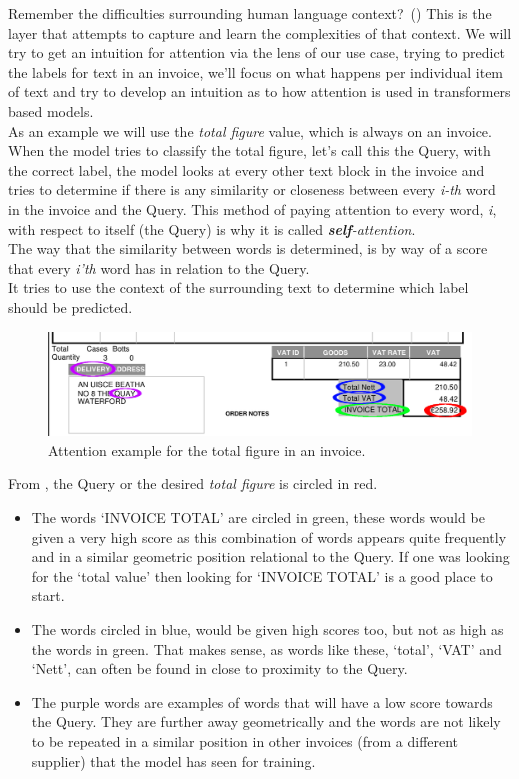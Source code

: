 Remember the difficulties surrounding human language context?~() This is the layer that attempts to capture and learn
the complexities of that context.
\bigbreak
We will try to get an intuition for attention via the lens of our use case, trying to predict the labels for text in an invoice,
we'll focus on what happens per individual item of text and try to develop an intuition as to how attention is used in
transformers based models.\\
As an example we will use the \emph{total figure} value, which is always on an invoice. When the model tries to classify the total figure,
let's call this the Query, with the correct label, the model looks at every other text
block in the invoice and tries to determine if there is any similarity or closeness between every \emph{i-th} word in the invoice and the Query. This
method of paying attention to every word, \emph{i}, with respect to itself (the Query) is why it is called \emph{\textbf{self}-attention}.\\
The way that the similarity between words is determined, is by way of a score that every \emph{i'th} word has in relation to the Query.\\
It tries to use the context of the surrounding text to determine which label should be predicted.
\begin{figure}[H]
	\centering
	\includegraphics[width=1\textwidth]{figures/attention_total_invoice.png}
	\caption{Attention example for the total figure in an invoice.}
	\label{fig:attention_total_invoice}
\end{figure}
From , the Query or the desired \emph{total figure} is circled in red.
\begin{itemize}
	\item The words `INVOICE TOTAL' are circled in green, these words would be given a very high score as this combination of words appears
	      quite frequently and in a similar geometric position relational to the Query. If one was looking for the `total value' then looking for
	      `INVOICE TOTAL' is a good place to start.
	\item The words circled in blue, would be given high scores too, but not as high as the words in green. That makes sense, as words like these,
	      `total', `VAT' and `Nett', can often be found in close to proximity to the Query.
	\item The purple words are examples of words that will have a low score towards the Query. They are further away geometrically and the
	      words are not likely to be repeated in a similar position in other invoices (from a different supplier) that the model has seen for training.
\end{itemize}
